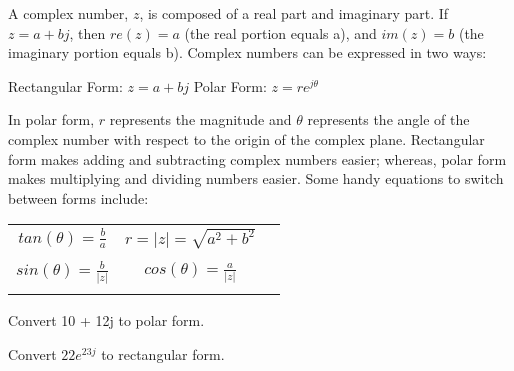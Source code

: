 
\usepackage{tikz}
\usepackage{pgfplots}
\pgfplotsset{width=7cm,compat=1.8}


A complex number, $z$, is composed of a real part and imaginary part.
If $z = a + bj$, then $re(z) = a$ (the real portion equals a), and $im(z) = b$ (the imaginary portion equals b).
Complex numbers can be expressed in two ways:

\begin{center}
Rectangular Form: $z = a + bj$ \hspace{1em} Polar Form: $z = re^{j\theta}$
\end{center}

In polar form, $r$ represents the magnitude and $\theta$ represents the angle of the complex number with respect to the origin of the complex plane.
Rectangular form makes adding and subtracting complex numbers easier; whereas, polar form makes multiplying and dividing numbers easier.
Some handy equations to switch between forms include:

\begin{center}
\begin{tabular}{ c c c }
 $tan(\theta) = \frac{b}{a}$ & $r = |z| = \sqrt{a^2 + b^2}$ \\ \\
 $sin(\theta) = \frac{b}{|z|}$ & $cos(\theta) = \frac{a}{|z|}$ \\  \\
\end{tabular}
\end{center}

\begin{enumerate}
\qitem Convert 10 + 12j to polar form.
\end{enumerate}

\begin{enumerate}
\qitem Convert $22e^{23j}$ to rectangular form.
\end{enumerate}


